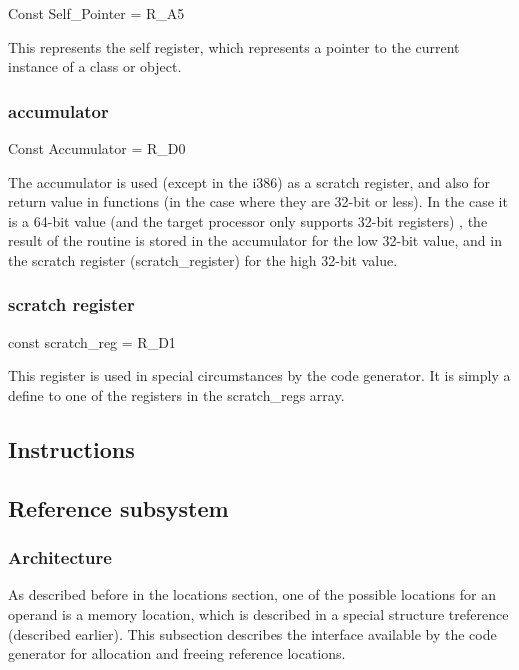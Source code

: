 \documentclass [a4paper,12pt]{article}
\begin{document}
\textsf{Const Self{\_}Pointer = R{\_}A5}

This represents the self register, which represents a pointer to the current
instance of a class or object.

\subsubsection{accumulator}
\label{subsubsec:accumulatorents}

\textsf{Const Accumulator = R{\_}D0}

The accumulator is used (except in the i386) as a scratch register, and also
for return value in functions (in the case where they are 32-bit or less).
In the case it is a 64-bit value (and the target processor only supports
32-bit registers) , the result of the routine is stored in the accumulator
for the low 32-bit value, and in the scratch register
(\textsf{scratch{\_}register}) for the high 32-bit value.

\subsubsection{scratch register}
\label{subsubsec:mylabel27}

\textsf{const scratch{\_}reg = R{\_}D1}

This register is used in special circumstances by the code generator. It is
simply a define to one of the registers in the \textsf{scratch{\_}regs
}array.

\subsection{Instructions}
\label{subsec:instructionsr}

\subsection{Reference subsystem}
\label{subsec:reference}

\subsubsection{Architecture}
\label{subsubsec:architecturebsysteme}

As described before in the locations section, one of the possible locations
for an operand is a memory location, which is described in a special
structure \textsf{treference} (described earlier). This subsection describes
the interface available by the code generator for allocation and freeing
reference locations.
\end{document}
